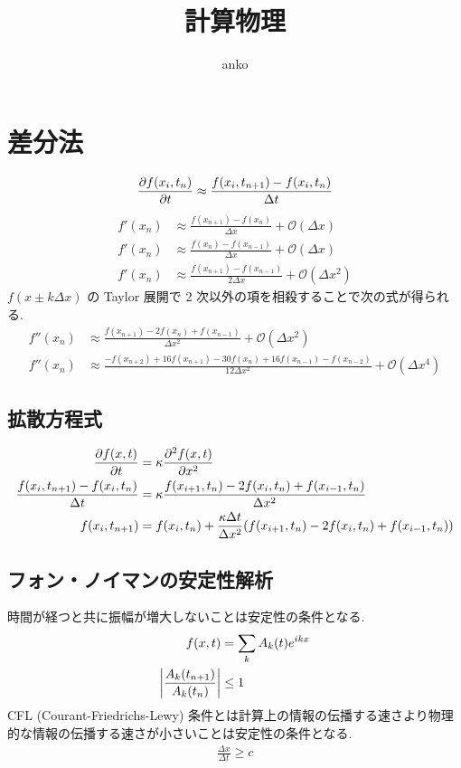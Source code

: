 \documentclass[a4paper,dvipdfmx]{jsarticle}
\theoremstyle{definition}
\begin{document}
\title{計算物理}
\author{anko}
\maketitle

\section{差分法}
\begin{align}
  \pdv{f(x_i, t_n)}{t} \approx \frac{f(x_i, t_{n+1}) - f(x_i, t_n)}{\Delta t}
\end{align}
\begin{align}
  f'(x_n) & \approx \frac{f(x_{n+1}) - f(x_n)}{\Delta x} + \mathcal{O}(\Delta x)        \\
  f'(x_n) & \approx \frac{f(x_n) - f(x_{n-1})}{\Delta x} + \mathcal{O}(\Delta x)        \\
  f'(x_n) & \approx \frac{f(x_{n+1}) - f(x_{n-1})}{2\Delta x} + \mathcal{O}(\Delta x^2)
\end{align}
$f(x\pm k\Delta x)$ の Taylor 展開で 2 次以外の項を相殺することで次の式が得られる.
\begin{align}
  f''(x_n) & \approx \frac{f(x_{n+1}) - 2f(x_n) + f(x_{n-1})}{\Delta x^2} + \mathcal{O}(\Delta x^2)                                   \\
  f''(x_n) & \approx \frac{-f(x_{n+2}) + 16f(x_{n+1}) - 30f(x_n) + 16f(x_{n-1}) - f(x_{n-2})}{12\Delta x^2} + \mathcal{O}(\Delta x^4)
\end{align}

\subsection{拡散方程式}
\begin{align}
  \pdv{f(x, t)}{t}                               & = \kappa\pdv[2]{f(x, t)}{x}                                                                             \\
  \frac{f(x_i, t_{n+1}) - f(x_i, t_n)}{\Delta t} & = \kappa\frac{f(x_{i+1}, t_n) - 2f(x_i, t_n) + f(x_{i-1}, t_n)}{\Delta x^2}                             \\
  f(x_i, t_{n+1})                                & = f(x_i, t_n) + \frac{\kappa\Delta t}{\Delta x^2}\qty(f(x_{i+1}, t_n) - 2f(x_i, t_n) + f(x_{i-1}, t_n))
\end{align}

\subsection{フォン・ノイマンの安定性解析}
時間が経つと共に振幅が増大しないことは安定性の条件となる.
\begin{align}
  f(x, t)                             & = \sum_kA_k(t)e^{ikx} \\
  \qty|\frac{A_k(t_{n+1})}{A_k(t_n)}| & \leq 1
\end{align}
CFL (Courant-Friedrichs-Lewy) 条件とは計算上の情報の伝播する速さより物理的な情報の伝播する速さが小さいことは安定性の条件となる.
\begin{align}
  \frac{\Delta x}{\Delta t} \geq c
\end{align}
\end{document}
